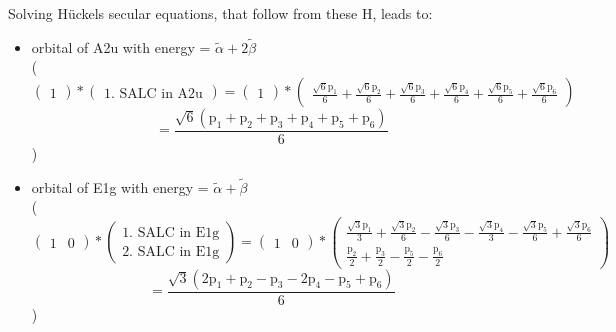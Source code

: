 \documentclass[12pt,a4paper]{article}
\begin{document}
Solving Hückels secular equations, that follow from these H, leads to:
\begin{itemize}
\item orbital of A2u with energy = 
                                $\tilde{\alpha} + 2 \tilde{\beta}$ \\
( 
$$
\begin{pmatrix}1\end{pmatrix} * \left(\begin{array}{c}\text{1. SALC in A2u}\end{array}\right) = \begin{pmatrix}1\end{pmatrix} * \begin{pmatrix}\frac{\sqrt{6} \text{p}_{1}}{6} + \frac{\sqrt{6} \text{p}_{2}}{6} + \frac{\sqrt{6} \text{p}_{3}}{6} + \frac{\sqrt{6} \text{p}_{4}}{6} + \frac{\sqrt{6} \text{p}_{5}}{6} + \frac{\sqrt{6} \text{p}_{6}}{6}\end{pmatrix} 
 $$ $$ = \frac{\sqrt{6} \left(\text{p}_{1} + \text{p}_{2} + \text{p}_{3} + \text{p}_{4} + \text{p}_{5} + \text{p}_{6}\right)}{6} 
 $$ 
 )

\item orbital of E1g with energy = 
                                $\tilde{\alpha} + \tilde{\beta}$ \\
( 
$$
\begin{pmatrix}1 & 0\end{pmatrix} * \left(\begin{array}{c}\text{1. SALC in E1g} \\ \text{2. SALC in E1g}\end{array}\right) = \begin{pmatrix}1 & 0\end{pmatrix} * \begin{pmatrix}\frac{\sqrt{3} \text{p}_{1}}{3} + \frac{\sqrt{3} \text{p}_{2}}{6} - \frac{\sqrt{3} \text{p}_{3}}{6} - \frac{\sqrt{3} \text{p}_{4}}{3} - \frac{\sqrt{3} \text{p}_{5}}{6} + \frac{\sqrt{3} \text{p}_{6}}{6}\\\frac{\text{p}_{2}}{2} + \frac{\text{p}_{3}}{2} - \frac{\text{p}_{5}}{2} - \frac{\text{p}_{6}}{2}\end{pmatrix} 
 $$ $$ = \frac{\sqrt{3} \left(2 \text{p}_{1} + \text{p}_{2} - \text{p}_{3} - 2 \text{p}_{4} - \text{p}_{5} + \text{p}_{6}\right)}{6} 
 $$ 
 )


\end{itemize}
\end{document}
